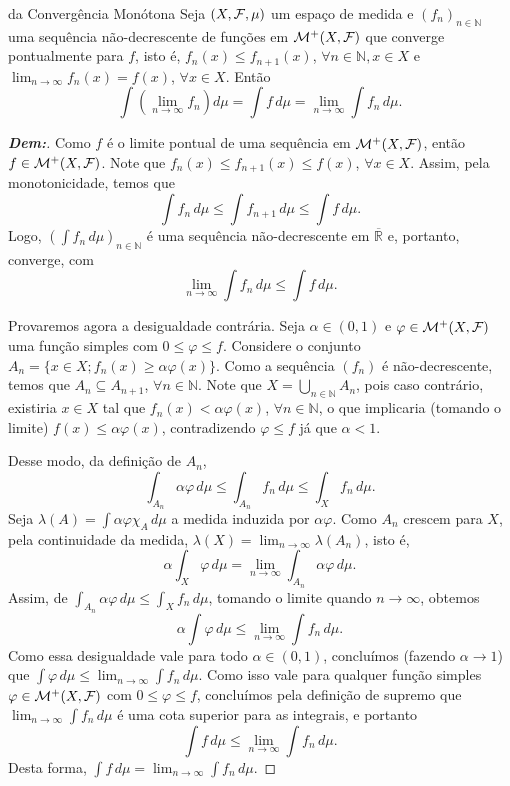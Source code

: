 \begin{theorem*}{ da Convergência Monótona}
Seja $(X, \mathcal{F}, \mu)$ um espaço de medida e $(f_n)_{n \in \mathbb{N}}$ uma sequência não-decrescente de funções em $\mathcal{M}^+(X, \mathcal{F})$ que converge pontualmente para $f$, isto é, $f_n(x) \le f_{n+1}(x)$, $\forall n \in \mathbb{N}, x \in X$ e $\lim_{n \to \infty} f_n(x) = f(x)$, $\forall x \in X$. Então
$$ \int \left( \lim_{n \to \infty} f_n \right) d\mu = \int f \, d\mu = \lim_{n \to \infty} \int f_n \, d\mu. $$
\end{theorem*}

\begin{proof}[\textbf{Dem:}]
Como $f$ é o limite pontual de uma sequência em $\mathcal{M}^+(X, \mathcal{F})$, então $f \in \mathcal{M}^+(X, \mathcal{F})$. Note que $f_n(x) \le f_{n+1}(x) \le f(x)$, $\forall x \in X$. Assim, pela monotonicidade, temos que
$$ \int f_n \, d\mu \le \int f_{n+1} \, d\mu \le \int f \, d\mu. $$
Logo, $\left( \int f_n \, d\mu \right)_{n \in \mathbb{N}}$ é uma sequência não-decrescente em $\overline{\mathbb{R}}$ e, portanto, converge, com
$$ \lim_{n \to \infty} \int f_n \, d\mu \le \int f \, d\mu. $$

Provaremos agora a desigualdade contrária. Seja $\alpha \in (0,1)$ e $\varphi \in \mathcal{M}^+(X, \mathcal{F})$ uma função simples com $0 \le \varphi \le f$. Considere o conjunto $A_n = \{x \in X ; f_n(x) \ge \alpha \varphi(x)\}$.
Como a sequência $(f_n)$ é não-decrescente, temos que $A_n \subseteq A_{n+1}$, $\forall n \in \mathbb{N}$. Note que $X = \bigcup_{n \in \mathbb{N}} A_n$, pois caso contrário, existiria $x \in X$ tal que $f_n(x) < \alpha \varphi(x)$, $\forall n \in \mathbb{N}$, o que implicaria (tomando o limite) $f(x) \le \alpha \varphi(x)$, contradizendo $\varphi \le f$ já que $\alpha < 1$.

Desse modo, da definição de $A_n$,
$$ \int_{A_n} \alpha \varphi \, d\mu \le \int_{A_n} f_n \, d\mu \le \int_X f_n \, d\mu. $$
Seja $\lambda(A) = \int \alpha \varphi \chi_A \, d\mu$ a medida induzida por $\alpha\varphi$. Como $A_n$ crescem para $X$, pela continuidade da medida, $\lambda(X) = \lim_{n \to \infty} \lambda(A_n)$, isto é,
$$ \alpha \int_X \varphi \, d\mu = \lim_{n \to \infty} \int_{A_n} \alpha \varphi \, d\mu. $$
Assim, de $\int_{A_n} \alpha \varphi \, d\mu \le \int_X f_n \, d\mu$, tomando o limite quando $n \to \infty$, obtemos
$$ \alpha \int \varphi \, d\mu \le \lim_{n \to \infty} \int f_n \, d\mu. $$
Como essa desigualdade vale para todo $\alpha \in (0,1)$, concluímos (fazendo $\alpha \to 1$) que $\int \varphi \, d\mu \le \lim_{n \to \infty} \int f_n \, d\mu$.
Como isso vale para qualquer função simples $\varphi \in \mathcal{M}^+(X, \mathcal{F})$ com $0 \le \varphi \le f$, concluímos pela definição de supremo que $\lim_{n \to \infty} \int f_n \, d\mu$ é uma cota superior para as integrais, e portanto
$$ \int f \, d\mu \le \lim_{n \to \infty} \int f_n \, d\mu. $$
Desta forma, $\int f \, d\mu = \lim_{n \to \infty} \int f_n \, d\mu$.
\end{proof}
